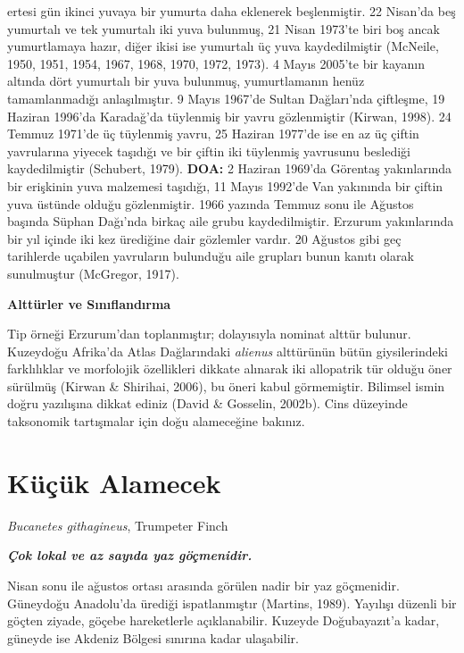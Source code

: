 \documentclass[
  10.5pt,
  a4paper,
  DIV=11,
  numbers=noendperiod,
  twocolumn]{scrreprt}
\begin{document}
ertesi gün ikinci yuvaya bir yumurta daha eklenerek beşlenmiştir. 22
Nisan'da beş yumurtalı ve tek yumurtalı iki yuva bulunmuş, 21 Nisan
1973'te biri boş ancak yumurtlamaya hazır, diğer ikisi ise yumurtalı üç
yuva kaydedilmiştir (McNeile, 1950, 1951, 1954, 1967, 1968, 1970, 1972,
1973). 4 Mayıs 2005'te bir kayanın altında dört yumurtalı bir yuva
bulunmuş, yumurtlamanın henüz tamamlanmadığı anlaşılmıştır. 9 Mayıs
1967'de Sultan Dağları'nda çiftleşme, 19 Haziran 1996'da Karadağ'da
tüylenmiş bir yavru gözlenmiştir (Kirwan, 1998). 24 Temmuz 1971'de üç
tüylenmiş yavru, 25 Haziran 1977'de ise en az üç çiftin yavrularına
yiyecek taşıdığı ve bir çiftin iki tüylenmiş yavrusunu beslediği
kaydedilmiştir (Schubert, 1979). \textbf{DOA:} 2 Haziran 1969'da
Görentaş yakınlarında bir erişkinin yuva malzemesi taşıdığı, 11 Mayıs
1992'de Van yakınında bir çiftin yuva üstünde olduğu gözlenmiştir. 1966
yazında Temmuz sonu ile Ağustos başında Süphan Dağı'nda birkaç aile
grubu kaydedilmiştir. Erzurum yakınlarında bir yıl içinde iki kez
ürediğine dair gözlemler vardır. 20 Ağustos gibi geç tarihlerde uçabilen
yavruların bulunduğu aile grupları bunun kanıtı olarak sunulmuştur
(McGregor, 1917).

\textbf{Alttürler ve Sınıflandırma}

Tip örneği Erzurum'dan toplanmıştır; dolayısıyla nominat alttür bulunur.
Kuzeydoğu Afrika'da Atlas Dağlarındaki \emph{alienus} alttürünün bütün
giysilerindeki farklılıklar ve morfolojik özellikleri dikkate alınarak
iki allopatrik tür olduğu öner sürülmüş (Kirwan \& Shirihai, 2006), bu
öneri kabul görmemiştir. Bilimsel ismin doğru yazılışına dikkat ediniz
(David \& Gosselin, 2002b). Cins düzeyinde taksonomik tartışmalar için
doğu alameceğine bakınız.

\section{Küçük Alamecek}\label{kuxfcuxe7uxfck-alamecek}

\emph{Bucanetes githagineus}, Trumpeter Finch

\textbf{\emph{Çok lokal ve az sayıda yaz göçmenidir.}}

Nisan sonu ile ağustos ortası arasında görülen nadir bir yaz göçmenidir.
Güneydoğu Anadolu'da ürediği ispatlanmıştır (Martins, 1989). Yayılışı
düzenli bir göçten ziyade, göçebe hareketlerle açıklanabilir. Kuzeyde
Doğubayazıt'a kadar, güneyde ise Akdeniz Bölgesi sınırına kadar
ulaşabilir.
\end{document}
